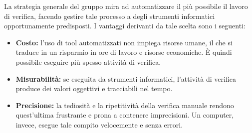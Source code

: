 La strategia generale del gruppo \gruppo \space mira ad automatizzare il più possibile il lavoro di verifica, facendo gestire tale processo a degli strumenti informatici opportunamente predisposti. \newline
I vantaggi derivanti da tale scelta sono i seguenti:
\begin{itemize}
    \item \textbf{Costo:} l'uso di {tool} automatizzati non impiega {risorse} umane, il che si traduce in un risparmio in ore di lavoro e risorse economiche. È quindi possibile eseguire più spesso attività di verifica.
    \item \textbf{Misurabilità:} se eseguita da strumenti informatici, l'attività di verifica produce dei valori oggettivi e tracciabili nel tempo.
    \item \textbf{Precisione:} la tediosità e la ripetitività della verifica manuale rendono quest'ultima frustrante e prona a contenere imprecisioni. Un computer, invece, esegue tale compito velocemente e senza errori.
\end{itemize}